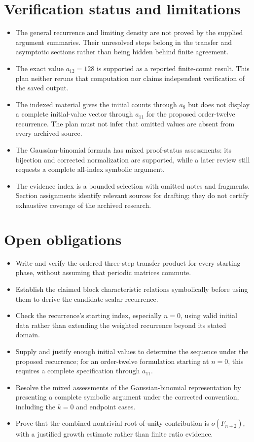 \documentclass[11pt]{article}
\begin{document}
\section{Verification status and limitations}
\begin{itemize}
\item The general recurrence and limiting density are not proved by the supplied argument summaries. Their unresolved steps belong in the transfer and asymptotic sections rather than being hidden behind finite agreement.
\item The exact value $a_{12}=128$ is supported as a reported finite-count result. This plan neither reruns that computation nor claims independent verification of the saved output.
\item The indexed material gives the initial counts through $a_8$ but does not display a complete initial-value vector through $a_{11}$ for the proposed order-twelve recurrence. The plan must not infer that omitted values are absent from every archived source.
\item The Gaussian-binomial formula has mixed proof-status assessments: its bijection and corrected normalization are supported, while a later review still requests a complete all-index symbolic argument.
\item The evidence index is a bounded selection with omitted notes and fragments. Section assignments identify relevant sources for drafting; they do not certify exhaustive coverage of the archived research.
\end{itemize}
\section{Open obligations}
\begin{itemize}
\item Write and verify the ordered three-step transfer product for every starting phase, without assuming that periodic matrices commute.
\item Establish the claimed block characteristic relations symbolically before using them to derive the candidate scalar recurrence.
\item Check the recurrence's starting index, especially $n=0$, using valid initial data rather than extending the weighted recurrence beyond its stated domain.
\item Supply and justify enough initial values to determine the sequence under the proposed recurrence; for an order-twelve formulation starting at $n=0$, this requires a complete specification through $a_{11}$.
\item Resolve the mixed assessments of the Gaussian-binomial representation by presenting a complete symbolic argument under the corrected convention, including the $k=0$ and endpoint cases.
\item Prove that the combined nontrivial root-of-unity contribution is $o(F_{n+2})$, with a justified growth estimate rather than finite ratio evidence.
\end{itemize}
\end{document}
